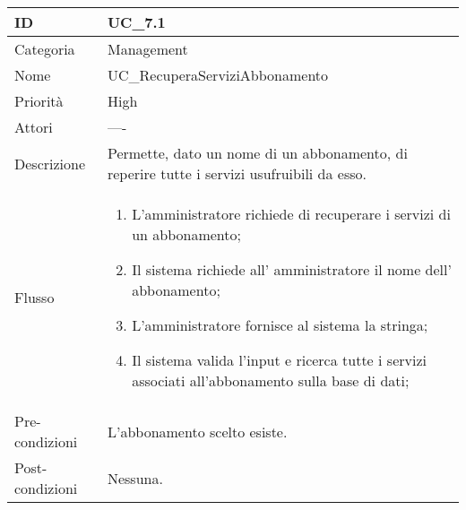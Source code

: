 \begin{center}
\begin{tabular}{ |p{2cm}|p{13cm}|  }
\hline
ID & UC\_7.1 \\\hline
Categoria & Management\\\hline
Nome & UC\_RecuperaServiziAbbonamento\\\hline
Priorità & High \\\hline
Attori &  ---- \\\hline
Descrizione & Permette, dato un nome di  un abbonamento, di reperire tutte i servizi usufruibili da esso.\\\hline
Flusso &  	\begin{enumerate}
			\item L'amministratore richiede di recuperare i servizi di un abbonamento;
			\item Il sistema richiede all' amministratore il nome dell' abbonamento;
			\item L'amministratore fornisce al sistema la stringa;
			\item Il sistema valida l'input e ricerca tutte i servizi associati all'abbonamento sulla base di dati;
		\end{enumerate}\\\hline
Pre-condizioni &  L'abbonamento scelto esiste.\\\hline
Post-condizioni &  Nessuna.\\\hline
\end{tabular}
\label{table_use_case:7.1}\newline


\end{center}
